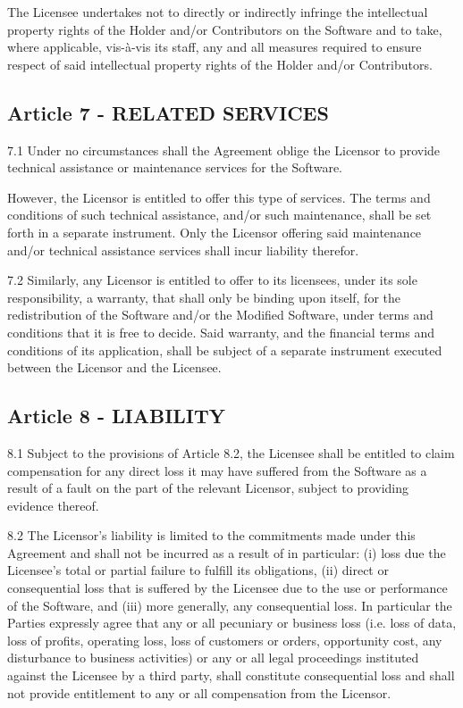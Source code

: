The Licensee undertakes not to directly or indirectly infringe the intellectual property rights of the Holder and/or Contributors on the Software and to take, where applicable, vis-à-vis its staff, any and all measures required to ensure respect of said intellectual property rights of the Holder and/or Contributors.

\subsection*{Article 7 - RELATED SERVICES}

7.1 Under no circumstances shall the Agreement oblige the Licensor to provide technical assistance or maintenance services for the Software.

However, the Licensor is entitled to offer this type of services. The terms and conditions of such technical assistance, and/or such maintenance, shall be set forth in a separate instrument. Only the Licensor offering said maintenance and/or technical assistance services shall incur liability therefor.

7.2 Similarly, any Licensor is entitled to offer to its licensees, under its sole responsibility, a warranty, that shall only be binding upon itself, for the redistribution of the Software and/or the Modified Software, under terms and conditions that it is free to decide. Said warranty, and the financial terms and conditions of its application, shall be subject of a separate instrument executed between the Licensor and the Licensee.

\subsection*{Article 8 - LIABILITY}

8.1 Subject to the provisions of Article 8.2, the Licensee shall be entitled to claim compensation for any direct loss it may have suffered from the Software as a result of a fault on the part of the relevant Licensor, subject to providing evidence thereof.

8.2 The Licensor's liability is limited to the commitments made under this Agreement and shall not be incurred as a result of in particular: (i) loss due the Licensee's total or partial failure to fulfill its obligations, (ii) direct or consequential loss that is suffered by the Licensee due to the use or performance of the Software, and (iii) more generally, any consequential loss. In particular the Parties expressly agree that any or all pecuniary or business loss (i.e. loss of data, loss of profits, operating loss, loss of customers or orders, opportunity cost, any disturbance to business activities) or any or all legal proceedings instituted against the Licensee by a third party, shall constitute consequential loss and shall not provide entitlement to any or all compensation from the Licensor.

